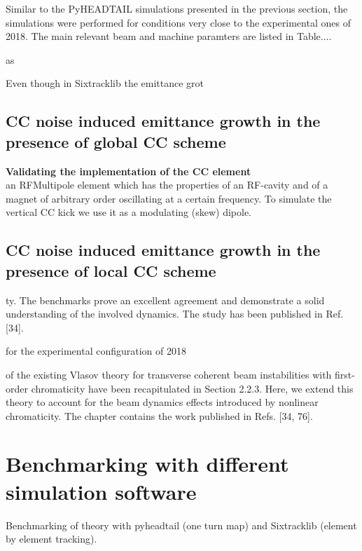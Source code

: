 Similar to the PyHEADTAIL simulations presented in the previous section, the simulations were performed for conditions very close to the experimental ones of 2018. The main relevant beam and machine paramters are listed in Table....


as 


Even though in Sixtracklib the emittance grot

\subsection{CC noise induced emittance growth in the presence of global CC scheme}\label{subsec:global_CC}


\textbf{Validating the implementation of the CC element}\\



an RFMultipole element which  has the properties of an RF-cavity and of a magnet of arbitrary order oscillating at a certain frequency. To simulate the vertical CC kick we use it as a modulating (skew) dipole.



\subsection{CC noise induced emittance growth in the presence of local CC scheme}\label{subsec:local_CC}

\newpage



ty. The
benchmarks prove an excellent agreement and demonstrate a solid understanding of the involved
dynamics. The study has been published in Ref. [34].


for the experimental configuration of 2018 

of the existing Vlasov theory for transverse coherent beam instabilities with first-order
chromaticity have been recapitulated in Section 2.2.3. Here, we extend this theory to account for the
beam dynamics effects introduced by nonlinear chromaticity. The chapter contains the work published
in Refs. [34, 76].




\section{Benchmarking with different simulation software}
Benchmarking of theory with pyheadtail (one turn map) and Sixtracklib (element by element tracking).



